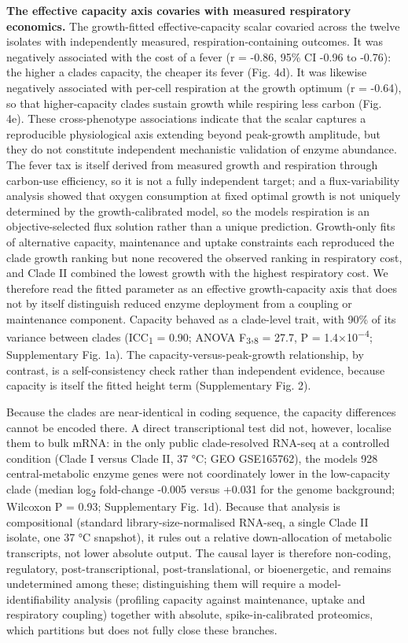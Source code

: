 \documentclass[
]{article}
\newcounter{none} %
\begin{document}
\textbf{The effective capacity axis covaries with measured respiratory
economics.} The growth-fitted effective-capacity scalar covaried across
the twelve isolates with independently measured, respiration-containing
outcomes. It was negatively associated with the cost of a fever (r =
-0.86, 95\% CI -0.96 to -0.76): the higher a clade\textquotesingle s
capacity, the cheaper its fever (Fig. 4d). It was likewise negatively
associated with per-cell respiration at the growth optimum (r = -0.64),
so that higher-capacity clades sustain growth while respiring less
carbon (Fig. 4e). These cross-phenotype associations indicate that the
scalar captures a reproducible physiological axis extending beyond
peak-growth amplitude, but they do not constitute independent
mechanistic validation of enzyme abundance. The fever tax is itself
derived from measured growth and respiration through carbon-use
efficiency, so it is not a fully independent target; and a
flux-variability analysis showed that oxygen consumption at fixed
optimal growth is not uniquely determined by the growth-calibrated
model, so the model\textquotesingle s respiration is an
objective-selected flux solution rather than a unique prediction.
Growth-only fits of alternative capacity, maintenance and uptake
constraints each reproduced the clade growth ranking but none recovered
the observed ranking in respiratory cost, and Clade II combined the
lowest growth with the highest respiratory cost. We therefore read the
fitted parameter as an effective growth-capacity axis that does not by
itself distinguish reduced enzyme deployment from a coupling or
maintenance component. Capacity behaved as a clade-level trait, with
90\% of its variance between clades (ICC\textsubscript{1} = 0.90; ANOVA
F\textsubscript{3},\textsubscript{8} = 27.7, P =
1.4×10\textsuperscript{−4}; Supplementary Fig. 1a). The
capacity-versus-peak-growth relationship, by contrast, is a
self-consistency check rather than independent evidence, because
capacity is itself the fitted height term (Supplementary Fig. 2).

Because the clades are near-identical in coding sequence, the capacity
differences cannot be encoded there. A direct transcriptional test did
not, however, localise them to bulk mRNA: in the only public
clade-resolved RNA-seq at a controlled condition (Clade I versus Clade
II, 37 °C; GEO GSE165762), the model\textquotesingle s 928
central-metabolic enzyme genes were not coordinately lower in the
low-capacity clade (median log\textsubscript{2} fold-change -0.005
versus +0.031 for the genome background; Wilcoxon P = 0.93;
Supplementary Fig. 1d). Because that analysis is compositional (standard
library-size-normalised RNA-seq, a single Clade II isolate, one 37 °C
snapshot), it rules out a relative down-allocation of metabolic
transcripts, not lower absolute output. The causal layer is therefore
non-coding, regulatory, post-transcriptional, post-translational, or
bioenergetic, and remains undetermined among these; distinguishing them
will require a model-identifiability analysis (profiling capacity
against maintenance, uptake and respiratory coupling) together with
absolute, spike-in-calibrated proteomics, which partitions but does not
fully close these branches.
\end{document}
